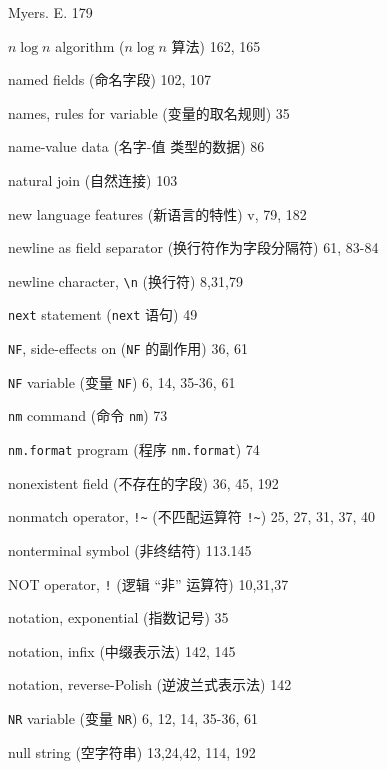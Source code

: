 \begin{multicols}{2}
\hangindent=2pc  Myers. E. 179

\hangindent=2pc  $n \log n$ algorithm ($n \log n$ 算法) 162, 165

\hangindent=2pc  named fields (命名字段) 102, 107

\hangindent=2pc  names, rules for variable (变量的取名规则) 35

\hangindent=2pc  name-value data (\mbox{名字}-值 类型的数据) 86

\hangindent=2pc  natural join (自然连接) 103

\hangindent=2pc  new language features (新语言的特性) v, 79, 182

\hangindent=2pc  newline as field separator (换行符作为字段分隔符)
61,  83-84

\hangindent=2pc  newline character, \verb'\n' (换行符) 8,31,79

\hangindent=2pc  \verb'next' statement (\verb'next' 语句) 49

\hangindent=2pc  \verb'NF', side-effects on (\verb'NF'
的副作用) 36, 61

\hangindent=2pc  \verb'NF' variable (变量 \verb'NF') 6, 14, 35-36, 61

\hangindent=2pc  \verb'nm' command (命令 \verb'nm') 73

\hangindent=2pc  \verb'nm.format' program (程序
\verb'nm.format') 74


\hangindent=2pc  nonexistent field (不存在的字段) 36, 45, 192

\hangindent=2pc  nonmatch operator, \verb'!~' (不匹配运算符
\verb'!~') 25, 27, 31, 37, 40

\hangindent=2pc  nonterminal symbol (非终结符) 113.145

\hangindent=2pc  NOT operator, \verb'!' (逻辑 ``非'' 运算符)
10,31,37

\hangindent=2pc  notation, exponential (指数记号) 35

\hangindent=2pc  notation, infix (中缀表示法) 142, 145

\hangindent=2pc  notation, reverse-Polish (逆波兰式表示法) 142

\hangindent=2pc  \verb'NR' variable (变量 \verb'NR')
6, 12, 14, 35-36, 61

\hangindent=2pc  null string (空字符串) 13,24,42, 114, 192


\end{multicols}

